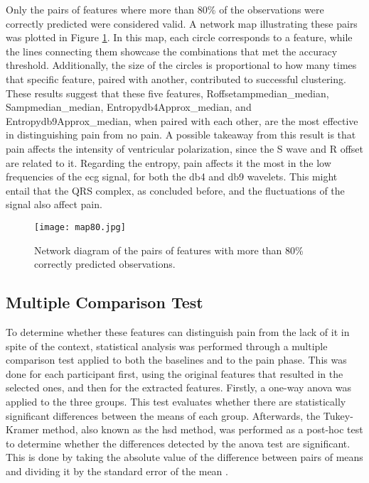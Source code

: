 \pagebreak
Only the pairs of features where more than 80\% of the observations were correctly predicted were considered valid. A network map illustrating these pairs was plotted in Figure \ref{fig:map80}. In this map, each circle corresponds to a feature, while the lines connecting them showcase the combinations that met the accuracy threshold. Additionally, the size of the circles is proportional to how many times that specific feature, paired with another, contributed to successful clustering. These results suggest that these five features, Roffsetampmedian\_median, Sampmedian\_median, Entropydb4Approx\_median, and Entropydb9Approx\_median, when paired with each other, are the most effective in distinguishing pain from no pain. A possible takeaway from this result is that pain affects the intensity of ventricular polarization, since the S wave and R offset are related to it. Regarding the entropy, pain affects it the most in the low frequencies of the \ac{ecg} signal, for both the db4 and db9 wavelets. This might entail that the QRS complex, as concluded before, and the fluctuations of the signal also affect pain.





\begin{figure}[h!]
    \centering
    \texttt{[image: map80.jpg]}
    \caption{Network diagram of the pairs of features with more than 80\% correctly predicted observations.}
    \label{fig:map80}
\end{figure}



\subsection{Multiple Comparison Test}

To determine whether these features can distinguish pain from the lack of it in spite of the context, statistical analysis was performed through a multiple comparison test applied to both the baselines and to the pain phase. This was done for each participant first, using the original features that resulted in the selected ones, and then for the extracted features. Firstly, a one-way \ac{anova} was applied to the three groups. This test evaluates whether there are statistically significant differences between the means of each group. Afterwards, the Tukey-Kramer method, also known as the \ac{hsd} method, was performed as a post-hoc test to determine whether the differences detected by the \ac{anova} test are significant. This is done by taking the absolute value of the difference between pairs of means and dividing it by the standard error of the mean \cite{Nanda2021}. %


